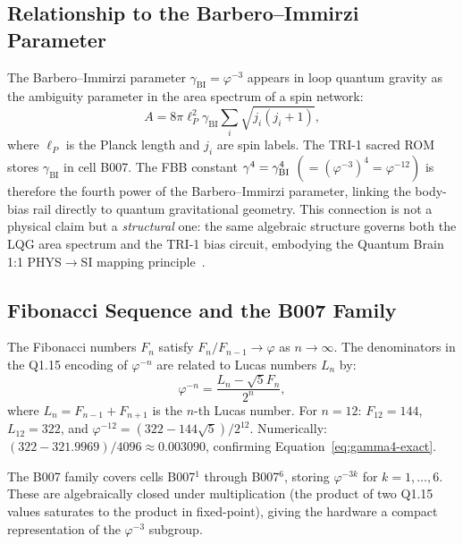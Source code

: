 \subsection{Relationship to the Barbero--Immirzi Parameter}
\label{subsec:bi-relationship}

The Barbero--Immirzi parameter $\gamma_{\mathrm{BI}} = \varphi^{-3}$
appears in loop quantum gravity as the ambiguity parameter in the
area spectrum of a spin network:
\begin{equation}
  A = 8\pi\ell_{P}^{2}\gamma_{\mathrm{BI}}
        \sum_{i}\sqrt{j_{i}(j_{i}+1)},
  \label{eq:lqg-area}
\end{equation}
where $\ell_{P}$ is the Planck length and $j_{i}$ are spin labels.
The TRI-1 sacred ROM stores $\gamma_{\mathrm{BI}}$ in cell B007.
The FBB constant $\gamma^{4}{} = \gamma_{\mathrm{BI}}^{4}$
$(= (\varphi^{-3})^{4} = \varphi^{-12})$ is therefore the fourth power
of the Barbero--Immirzi parameter, linking the body-bias rail directly
to quantum gravitational geometry.  This connection is not a physical
claim but a \emph{structural} one: the same algebraic structure governs
both the LQG area spectrum and the TRI-1 bias circuit, embodying the
Quantum Brain 1:1 PHYS$\to$SI mapping
principle~\cite{TrinityAnchor2026,Vasilev2026}.

\subsection{Fibonacci Sequence and the B007 Family}
\label{subsec:fibonacci-b007}

The Fibonacci numbers $F_{n}$ satisfy $F_{n}/F_{n-1} \to \varphi$
as $n \to \infty$.  The denominators in the Q1.15 encoding of
$\varphi^{-n}$ are related to Lucas numbers $L_{n}$ by:
\begin{equation}
  \varphi^{-n} = \frac{L_{n} - \sqrt{5}F_{n}}{2^{n}},
  \label{eq:phi-fib-lucas}
\end{equation}
where $L_{n} = F_{n-1} + F_{n+1}$ is the $n$-th Lucas number.
For $n=12$: $F_{12}=144$, $L_{12}=322$, and
$\varphi^{-12} = (322 - 144\sqrt{5})/2^{12}$.
Numerically: $(322 - 321.9969)/4096 \approx 0.003090$, confirming
Equation~\eqref{eq:gamma4-exact}.

The B007 family covers cells B007$^{1}$ through B007$^{6}$,
storing $\varphi^{-3k}$ for $k = 1, \ldots, 6$.  These are
algebraically closed under multiplication (the product of two
Q1.15 values saturates to the product in fixed-point), giving
the hardware a compact representation of the $\varphi^{-3}$
subgroup.

